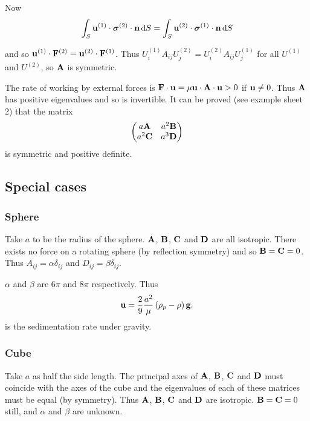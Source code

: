 \documentclass{notes}
\newcommand{\bs}{\boldsymbol{\sigma}}
\theoremstyle{plain}
\begin{document}
\vspace{1in}

Now
\[
\int_S \vu^{(1)} \cdot \bs^{(2)} \cdot \vn\, \ud S
= \int_S \vu^{(2)} \cdot \bs^{(1)} \cdot \vn\, \ud S
\]

and so $\mathbf{u}^{(1)} \cdot \mathbf{F}^{(2)} = \mathbf{u}^{(2)} \cdot \mathbf{F}^{(1)}$.  Thus
$U^{(1)}_i A_{i j} U^{(2)}_j = U^{(2)}_i A_{i j} U^{(1)}_j$ for
all $U^{(1)}$ and $U^{(2)}$, so $\mathbf{A}$ is symmetric.

The rate of working by external forces is $\mathbf{F} \cdot \mathbf{u}
= \mu \mathbf{u} \cdot \mathbf{A} \cdot \mathbf{u} > 0$ if $\mathbf{u} \neq 0$.  Thus $\mathbf{A}$
has positive eigenvalues and so is invertible.  It can be proved
(see example sheet 2) that the matrix
\[
\begin{pmatrix}
a \mathbf{A} & a^2 \mathbf{B} \\
a^2 \mathbf{C} & a^3 \mathbf{D}
\end{pmatrix}
\]
is symmetric and positive definite.

\subsection{Special cases}

\subsubsection*{Sphere}

Take $a$ to be the radius of the sphere.  $\mathbf{A}$, $\mathbf{B}$, $\mathbf{C}$
and $\mathbf{D}$ are all isotropic.  There exists no force on a rotating
sphere (by reflection symmetry) and so $\mathbf{B} = \mathbf{C} = 0$.  Thus
$A_{i j} = \alpha \delta_{i j}$ and $D_{i j} = \beta \delta_{i j}$.

$\alpha$ and $\beta$ are $6 \pi$ and $8 \pi$ respectively.  Thus
\[
\mathbf{u} = \frac{2}{9} \frac{a^2}{\mu} \left( \rho_p - \rho\right) \mathbf{g}.
\]
is the sedimentation rate under gravity.

\subsubsection*{Cube}

Take $a$ as half the side length.  The principal axes of $\mathbf{A}$,
$\mathbf{B}$, $\mathbf{C}$ and $\mathbf{D}$ must coincide with the axes
of the cube and the eigenvalues of each of these
matrices must be equal (by symmetry).  Thus $\mathbf{A}$,
$\mathbf{B}$, $\mathbf{C}$ and $\mathbf{D}$ are isotropic. $\mathbf{B} = \mathbf{C} = 0$
still, and $\alpha$ and $\beta$ are unknown.
\end{document}
